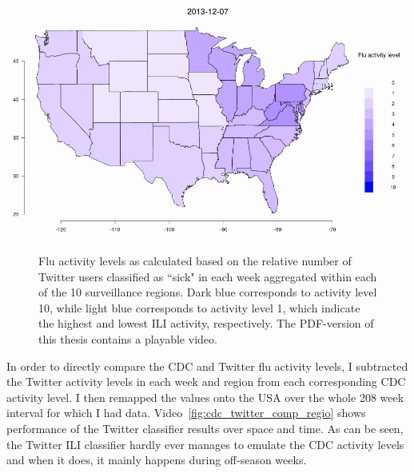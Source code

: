 \documentclass[11pt, a4paper,twoside]{report}\usepackage[]{graphicx}\usepackage[]{color}
\begin{document}
\begin{center}
\href{run:vids/2_twitter_flu_regio.avi}{\includegraphics[width=0.9\linewidth]{vids/2_twitter_flu_regio.png}}
\end{center}
\begin{figure}[htbp!]
\centering
  \caption{Flu activity levels as calculated based on the relative number of Twitter users classified as ``sick" in each week aggregated within each of the 10 surveillance regions. Dark blue corresponds to activity level 10, while light blue corresponds to activity level 1, which indicate the highest and lowest ILI activity, respectively. The PDF-version of this thesis contains a playable video.}
    \label{fig:twitter_flu_regio}
\end{figure}

In order to directly compare the CDC and Twitter flu activity levels, I subtracted the Twitter activity levels in each week and region from each corresponding CDC activity level. I then remapped the values onto the USA over the whole 208 week interval for which I had data. Video~\ref{fig:cdc_twitter_comp_regio} shows performance of the Twitter classifier results over space and time. As can be seen, the Twitter ILI classifier hardly ever manages to emulate the CDC activity levels and when it does, it mainly happens during off-season weeks. 
\end{document}
